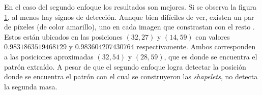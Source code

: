 \begin{figure}
	\caption{} \label{fig:example-mm-approach2}
\end{figure}

En el caso del segundo enfoque los resultados son mejores. Si se observa la figura \ref{fig:example-mm-approach2}, al menos hay signos de detección.
Aunque bien difíciles de ver, existen un par de píxeles (de color amarillo), uno en cada imagen que constrastan con el resto .
Estos están ubicados en las posiciones $(32,27)$ y $(14,59)$ con valores $0.9831863519468129$ y $0.983604207430764$
respectivamente. Ambos corresponden a las posiciones aproximadas $(32,54)$ y $(28,59)$, que es donde se encuentra el patrón extraído.
A pesar de que el segundo enfoque logra detectar la posición donde se encuentra el patrón con el cual se construyeron
las \textit{shapelets}, no detecta la segunda masa.

